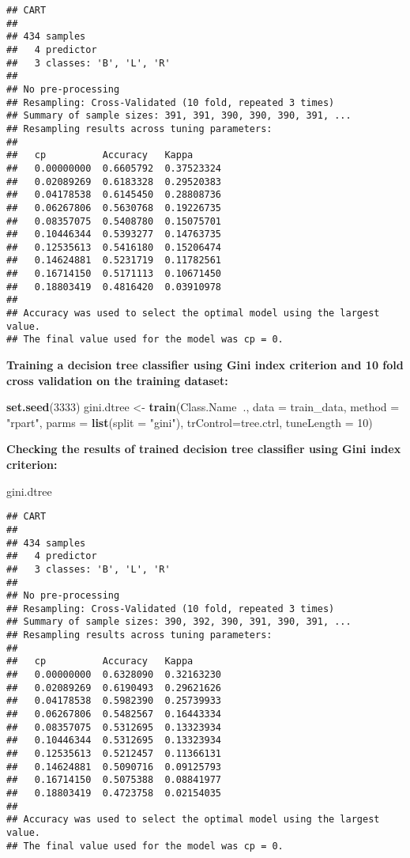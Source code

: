 \documentclass[
]{article}
\newenvironment{Shaded}{\begin{snugshade}}{\end{snugshade}}
\newcommand{\DataTypeTok}[1]{\textcolor[rgb]{0.13,0.29,0.53}{#1}}
\newcommand{\DecValTok}[1]{\textcolor[rgb]{0.00,0.00,0.81}{#1}}
\newcommand{\KeywordTok}[1]{\textcolor[rgb]{0.13,0.29,0.53}{\textbf{#1}}}
\newcommand{\NormalTok}[1]{#1}
\newcommand{\OperatorTok}[1]{\textcolor[rgb]{0.81,0.36,0.00}{\textbf{#1}}}
\newcommand{\StringTok}[1]{\textcolor[rgb]{0.31,0.60,0.02}{#1}}
\begin{document}
\begin{verbatim}
## CART 
## 
## 434 samples
##   4 predictor
##   3 classes: 'B', 'L', 'R' 
## 
## No pre-processing
## Resampling: Cross-Validated (10 fold, repeated 3 times) 
## Summary of sample sizes: 391, 391, 390, 390, 390, 391, ... 
## Resampling results across tuning parameters:
## 
##   cp          Accuracy   Kappa     
##   0.00000000  0.6605792  0.37523324
##   0.02089269  0.6183328  0.29520383
##   0.04178538  0.6145450  0.28808736
##   0.06267806  0.5630768  0.19226735
##   0.08357075  0.5408780  0.15075701
##   0.10446344  0.5393277  0.14763735
##   0.12535613  0.5416180  0.15206474
##   0.14624881  0.5231719  0.11782561
##   0.16714150  0.5171113  0.10671450
##   0.18803419  0.4816420  0.03910978
## 
## Accuracy was used to select the optimal model using the largest value.
## The final value used for the model was cp = 0.
\end{verbatim}

\textbf{Training a decision tree classifier using Gini index criterion
and 10 fold cross validation on the training dataset:}

\begin{Shaded}
\begin{Highlighting}[]
\KeywordTok{set.seed}\NormalTok{(}\DecValTok{3333}\NormalTok{)}
\NormalTok{gini.dtree <-}\StringTok{ }\KeywordTok{train}\NormalTok{(Class.Name}\OperatorTok{~}\NormalTok{., }\DataTypeTok{data =}\NormalTok{ train_data, }\DataTypeTok{method =} \StringTok{"rpart"}\NormalTok{,}
                   \DataTypeTok{parms =} \KeywordTok{list}\NormalTok{(}\DataTypeTok{split =} \StringTok{"gini"}\NormalTok{),}
                   \DataTypeTok{trControl=}\NormalTok{tree.ctrl,}
                   \DataTypeTok{tuneLength =} \DecValTok{10}\NormalTok{)}
\end{Highlighting}
\end{Shaded}

\textbf{Checking the results of trained decision tree classifier using
Gini index criterion:}

\begin{Shaded}
\begin{Highlighting}[]
\NormalTok{gini.dtree}
\end{Highlighting}
\end{Shaded}

\begin{verbatim}
## CART 
## 
## 434 samples
##   4 predictor
##   3 classes: 'B', 'L', 'R' 
## 
## No pre-processing
## Resampling: Cross-Validated (10 fold, repeated 3 times) 
## Summary of sample sizes: 390, 392, 390, 391, 390, 391, ... 
## Resampling results across tuning parameters:
## 
##   cp          Accuracy   Kappa     
##   0.00000000  0.6328090  0.32163230
##   0.02089269  0.6190493  0.29621626
##   0.04178538  0.5982390  0.25739933
##   0.06267806  0.5482567  0.16443334
##   0.08357075  0.5312695  0.13323934
##   0.10446344  0.5312695  0.13323934
##   0.12535613  0.5212457  0.11366131
##   0.14624881  0.5090716  0.09125793
##   0.16714150  0.5075388  0.08841977
##   0.18803419  0.4723758  0.02154035
## 
## Accuracy was used to select the optimal model using the largest value.
## The final value used for the model was cp = 0.
\end{verbatim}
\end{document}
